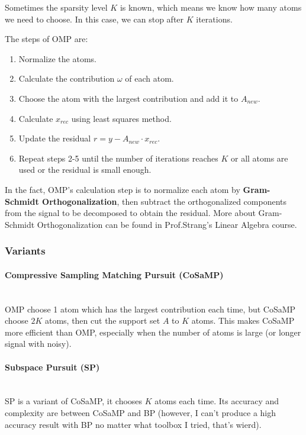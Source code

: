 \documentclass[12pt]{ctexart}
\begin{document}
Sometimes the sparsity level $K$ is known, which means we know how many atoms we need
to choose. In this case, we can stop after $K$ iterations.

The steps of OMP are:
\begin{enumerate}
  \item Normalize the atoms.
  \item Calculate the contribution $\omega$ of each atom.
  \item Choose the atom with the largest contribution and add it to $A_{new}$.
  \item Calculate $x_{rec}$ using least squares method.
  \item Update the residual $r = y - A_{new} \cdot x_{rec}$.
  \item Repeat steps 2-5 until the number of iterations reaches $K$ or all atoms are
  used or the residual is small enough.
\end{enumerate}

In the fact, OMP's calculation step is to normalize each atom by \textbf{Gram-Schmidt
Orthogonalization}, then subtract the orthogonalized components from the signal to be
decomposed to obtain the residual. More about Gram-Schmidt Orthogonalization
can be found in Prof.Strang's Linear Algebra course.

\subsubsection{\textbf{Variants}}

\paragraph{\textbf{Compressive Sampling Matching Pursuit (CoSaMP)}}\mbox{}\\
OMP choose 1 atom which has the largest contribution each time, but CoSaMP choose
$2K$ atoms, then cut the support set $A$ to $K$ atoms. This makes CoSaMP more
efficient than OMP, especially when the number of atoms is large (or longer
signal with noisy).

\paragraph{\textbf{Subspace Pursuit (SP)}}\mbox{}\\
SP is a variant of CoSaMP, it chooses $K$ atoms each time. Its accuracy and complexity
are between CoSaMP and BP (however, I can't produce a high accuracy result with BP no
matter what toolbox I tried, that's wierd).
\end{document}
